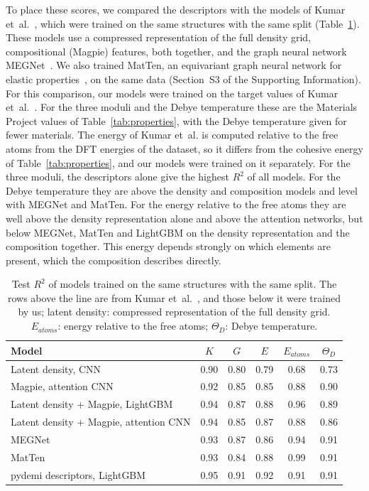 \documentclass[journal=jctcce,manuscript=article,email=true]{achemso}
\newcommand{\rev}[1]{{\color{blue}#1}}
\begin{document}
To place these scores, we compared the descriptors with the models of Kumar et~al.~\cite{kumar2026}, which were trained on the same structures with the same
split (Table~\ref{tab:compare}). These models use a compressed representation of the full density grid,
compositional (Magpie) features, both together, and the graph neural network MEGNet~\cite{chen2019}. We also trained MatTen,
an equivariant graph neural network for elastic properties~\cite{wen2024}, on
the same data (Section~S3 of the Supporting Information). For this comparison,
our models were trained on the target values of Kumar et~al.~\cite{kumar2026}. For the
three moduli and the Debye temperature these are the Materials Project values of
Table~\ref{tab:properties}, with the Debye temperature given for fewer
materials. The energy of Kumar et~al. is computed relative to the free
atoms from the DFT energies of the dataset, so it differs from the cohesive
energy of Table~\ref{tab:properties}, and our models were trained on it
separately. For the three moduli, the descriptors alone give the highest $R^2$
of all models. For the Debye temperature they are above the density and
composition models and level with MEGNet and MatTen. For
the energy relative to the free atoms they are well above the density
representation alone \rev{and above the attention networks, but below MEGNet,
MatTen and LightGBM on the density representation and the composition together}. This energy depends strongly on which elements are present, which
the composition describes directly.

\begin{table}[!tp]
\centering
\caption{Test $R^2$ of models trained on the same structures with the same split. The rows above the line are from Kumar et~al.~\cite{kumar2026}, and those below it were trained by us; latent density: compressed representation of the full density grid. $E_{atoms}$: energy relative to the free atoms; $\Theta_D$: Debye temperature.}
\label{tab:compare}
\footnotesize
\begin{tabular}{@{}lccccc@{}}
\toprule
Model & $K$ & $G$ & $E$ & $E_{atoms}$ & $\Theta_D$ \\
\midrule
Latent density, CNN & 0.90 & 0.80 & 0.79 & 0.68 & 0.73 \\
Magpie, attention CNN & 0.92 & 0.85 & 0.85 & 0.88 & 0.90 \\
Latent density + Magpie, LightGBM & 0.94 & 0.87 & 0.88 & 0.96 & 0.89 \\
Latent density + Magpie, attention CNN & 0.94 & 0.85 & 0.87 & 0.88 & 0.86 \\
MEGNet & 0.93 & 0.87 & 0.86 & 0.94 & 0.91 \\
\midrule
MatTen & 0.93 & 0.84 & 0.88 & 0.99 & 0.91 \\
pydemi descriptors, LightGBM & 0.95 & 0.91 & 0.92 & \rev{0.91} & 0.91 \\
\bottomrule
\end{tabular}
\end{table}
\end{document}
